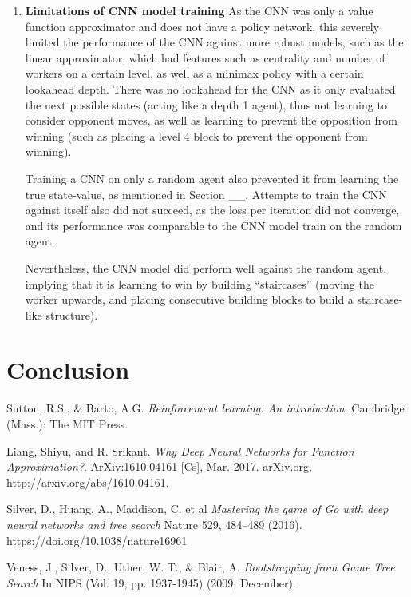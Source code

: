 \documentclass[a4paper,12pt,table]{article}
\begin{document}
\begin{enumerate}
    \item \textbf{Limitations of CNN model training}
    \newline
    As the CNN was only a value function approximator and does not have a policy network, this severely limited the performance of the CNN against more robust models, such as the linear approximator, which had features such as centrality and number of workers on a certain level, as well as a minimax policy with a certain lookahead depth. There was no lookahead for the CNN as it only evaluated the next possible states (acting like a depth 1 agent), thus not learning to consider opponent moves, as well as learning to prevent the opposition from winning (such as placing a level 4 block to prevent the opponent from winning).  \par

    Training a CNN on only a random agent also prevented it from learning the true state-value, as mentioned in Section \_\_. Attempts to train the CNN against itself also did not succeed, as the loss per iteration did not converge, and its performance was comparable to the CNN model train on the random agent. \par

    Nevertheless, the CNN model did perform well against the random agent, implying that it is learning to win by building “staircases” (moving the worker upwards, and placing consecutive building blocks to build a staircase-like structure).  \par

\end{enumerate}

\section{Conclusion}

\begin{thebibliography}{9}
    Sutton, R.S., \& Barto, A.G. 
    \textit{Reinforcement learning: An introduction}. 
    Cambridge (Mass.): The MIT Press.
    
    Liang, Shiyu, and R. Srikant. 
    \textit{Why Deep Neural Networks for Function Approximation?}. 
    ArXiv:1610.04161 [Cs], Mar. 2017. arXiv.org, http://arxiv.org/abs/1610.04161.

    Silver, D., Huang, A., Maddison, C. et al
    \textit{Mastering the game of Go with deep neural networks and tree search}
    Nature 529, 484–489 (2016). https://doi.org/10.1038/nature16961

    Veness, J., Silver, D., Uther, W. T., \& Blair, A.
    \textit{Bootstrapping from Game Tree Search}
    In NIPS (Vol. 19, pp. 1937-1945) (2009, December).

\end{thebibliography}
\end{document}
